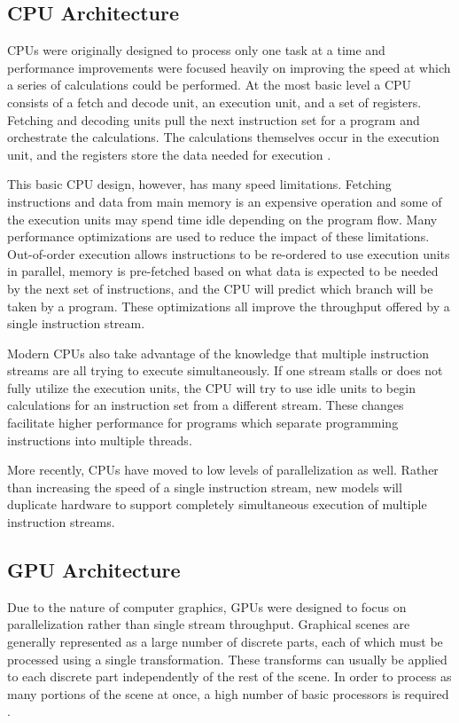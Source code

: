 \subsection{CPU Architecture}

CPUs were originally designed to process only one task at a time and performance improvements were focused heavily on improving the speed at which a series of calculations could be performed. At the most basic level a CPU consists of a fetch and decode unit, an execution unit, and a set of registers. Fetching and decoding units pull the next instruction set for a program and orchestrate the calculations. The calculations themselves occur in the execution unit, and the registers store the data needed for execution \cite{GPGPU}.

This basic CPU design, however, has many speed limitations. Fetching instructions and data from main memory is an expensive operation and some of the execution units may spend time idle depending on the program flow. Many performance optimizations are used to reduce the impact of these limitations. Out-of-order execution allows instructions to be re-ordered to use execution units in parallel, memory is pre-fetched based on what data is expected to be needed by the next set of instructions, and the CPU will predict which branch will be taken by a program. These optimizations all improve the throughput offered by a single instruction stream.

Modern CPUs also take advantage of the knowledge that multiple instruction streams are all trying to execute simultaneously. If one stream stalls or does not fully utilize the execution units, the CPU will try to use idle units to begin calculations for an instruction set from a different stream. These changes facilitate higher performance for programs which separate programming instructions into multiple threads.

More recently, CPUs have moved to low levels of parallelization as well. Rather than increasing the speed of a single instruction stream, new models will duplicate hardware to support completely simultaneous execution of multiple instruction streams.

\subsection{GPU Architecture}

Due to the nature of computer graphics, GPUs were designed to focus on parallelization rather than single stream throughput. Graphical scenes are generally represented as a large number of discrete parts, each of which must be processed using a single transformation. These transforms can usually be applied to each discrete part independently of the rest of the scene. In order to process as many portions of the scene at once, a high number of basic processors is required \cite{GPGPU}.

